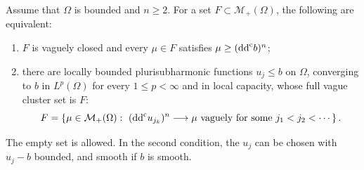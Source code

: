 \begin{theorem}\label{thm:bounded-background-cluster-sets}\label{thm:zero-local-cluster-sets}
Assume that $\Omega$ is bounded and $n\geq2$. For a set $F\subset\mathcal M_+(\Omega)$, the following are equivalent:
\begin{enumerate}
\item $F$ is vaguely closed and every $\mu\in F$ satisfies $\mu\geq(\mathrm{dd}^{\mathrm{c}} b)^n$;
\item there are locally bounded plurisubharmonic functions $u_j\leq b$ on $\Omega$, converging to $b$ in $L^p(\Omega)$ for every $1\leq p<\infty$ and in local capacity, whose full vague cluster set is $F$:
\[
 F=\left\{\mu\in\mathcal M_+(\Omega):\ (\mathrm{dd}^{\mathrm{c}} u_{j_k})^n\longrightarrow\mu
        \text{ vaguely for some }j_1<j_2<\cdots\right\}.
\]
\end{enumerate}
The empty set is allowed. In the second condition, the $u_j$ can be chosen with $u_j-b$ bounded, and smooth if $b$ is smooth.
\end{theorem}
